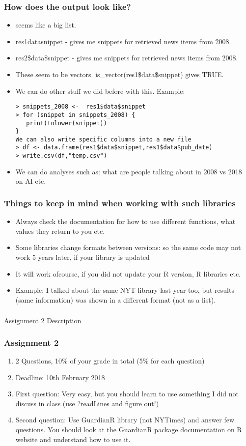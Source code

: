 \documentclass{beamer}
\begin{document}
\begin{frame}[fragile]
\frametitle{How does the output look like?}
\begin{itemize}
\item seems like a big list. 
\item res1\textdollar data\textdollar snippet - gives me snippets for retrieved news items from 2008.
\item  res2\$data\$snippet - gives me snippets for retrieved news items from 2008.
\item These seem to be vectors. is\_vector(res1\$data\$snippet) gives TRUE.
\item We can do other stuff we did before with this. Example: \tiny
\begin{verbatim}
> snippets_2008 <-  res1$data$snippet
> for (snippet in snippets_2008) {
   print(tolower(snippet))
}
We can also write specific columns into a new file
> df <- data.frame(res1$data$snippet,res1$data$pub_date)
> write.csv(df,"temp.csv")
\end{verbatim} \small
\item We can do analyses such as: what are people talking about in 2008 vs 2018 on AI etc.
\end{itemize}
\end{frame}

\begin{frame}
\frametitle{Things to keep in mind when working with such libraries}
\begin{itemize}
\item Always check the documentation for how to use different functions, what values they return to you etc.
\item Some libraries change formats between versions: so the same code may not work 5 years later, if your library is updated
\item It will work ofcourse, if you did not update your R version, R libraries etc. 
\item Example: I talked about the same NYT library last year too, but results (same information) was shown in a different format (not as a list). 
\end{itemize}
\end{frame}

\begin{frame}
\frametitle{}
\Large Assignment 2 Description
\end{frame}

\begin{frame}
\frametitle{Assignment 2}
\begin{enumerate}
\item 2 Questions, 10\% of your grade in total (5\% for each question)
\item Deadline: 10th February 2018
\item First question: Very easy, but you should learn to use something I did not discuss in class (use ?readLines and figure out!)
\item Second question: Use GuardianR library (not NYTimes) and answer few questions. You should look at the GuardianR package documentation on R website and understand how to use it.
\end{enumerate}
\end{frame}
\end{document}
